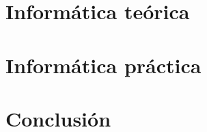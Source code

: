 \documentclass[openany]{book}
\begin{document}


\part{Informática teórica}





 

\part{Informática práctica}





\part{Conclusión}


 



\renewcommand{\chaptername}{}
\printbibliography[heading=bibintoc]
\nocite{*}
\end{document}
